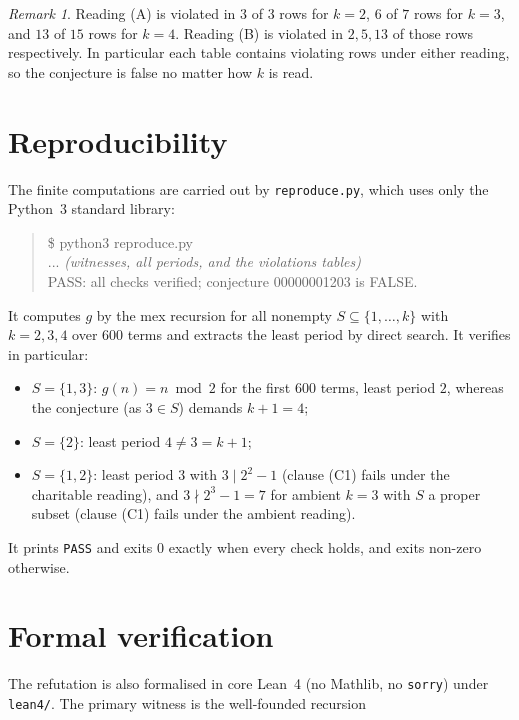 \documentclass[11pt]{article}
\theoremstyle{definition}
\theoremstyle{remark}
\newtheorem{remark}[theorem]{Remark}
\begin{document}
\begin{remark}
Reading (A) is violated in $3$ of $3$ rows for $k=2$, $6$ of $7$ rows for
$k=3$, and $13$ of $15$ rows for $k=4$. Reading (B) is violated in $2, 5, 13$
of those rows respectively. In particular each table contains violating rows
under either reading, so the conjecture is false no matter how $k$ is read.
\end{remark}

\section{Reproducibility}

The finite computations are carried out by \texttt{reproduce.py}, which uses
only the Python~3 standard library:

\begin{quote}\ttfamily
\$ python3 reproduce.py\\
... \textit{(witnesses, all periods, and the violations tables)}\\
PASS: all checks verified; conjecture 00000001203 is FALSE.
\end{quote}

It computes $g$ by the mex recursion for all nonempty $S \subseteq \{1,\dots,k\}$
with $k = 2,3,4$ over $600$ terms and extracts the least period by direct
search. It verifies in particular:

\begin{itemize}
\item $S=\{1,3\}$: $g(n) = n \bmod 2$ for the first $600$ terms, least period
  $2$, whereas the conjecture (as $3 \in S$) demands $k+1 = 4$;
\item $S=\{2\}$: least period $4 \ne 3 = k+1$;
\item $S=\{1,2\}$: least period $3$ with $3 \mid 2^2 - 1$ (clause (C1) fails
  under the charitable reading), and $3 \nmid 2^3 - 1 = 7$ for ambient $k=3$
  with $S$ a proper subset (clause (C1) fails under the ambient reading).
\end{itemize}

It prints \texttt{PASS} and exits $0$ exactly when every check holds, and exits
non-zero otherwise.

\section{Formal verification}

The refutation is also formalised in core Lean~4 (no Mathlib, no \texttt{sorry})
under \texttt{lean4/}. The primary witness is the well-founded recursion
\end{document}
